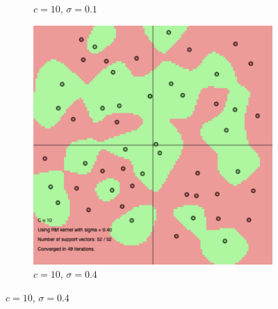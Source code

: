 \documentclass[a4paper, 11pt, one column]{article}
\begin{document}
\begin{figure}
\begin{subfigure}{0.3\textwidth}
   \caption{$c=10$, $\sigma=0.1$} \label{fig:x_e}
\end{subfigure}
\hspace*{\fill}
\begin{subfigure}{0.3\textwidth}
   \includegraphics[width=\linewidth]{images/rbf_c_10_s_0.4.png}
   \caption{$c=10$, $\sigma=0.4$} \label{fig:x_f}
\end{subfigure}


\end{figure}
\end{document}
